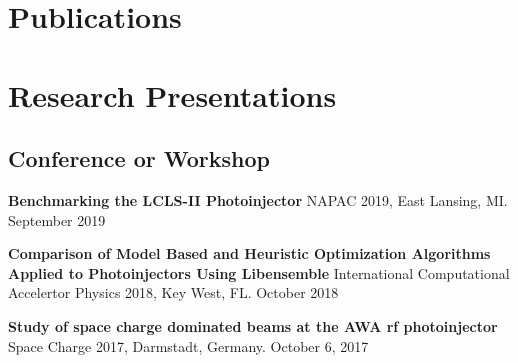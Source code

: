 \documentclass[11pt,a4paper,sans]{moderncv}        %
\begin{document}
\newpage

\section{Publications}

\vspace{1em}

\vspace{1em}

\vspace{1em}

\vspace{1em}

%

\section{Research Presentations}
\subsection{Conference or Workshop} %
\textbf{Benchmarking the LCLS-II Photoinjector}\newline
NAPAC 2019, East Lansing, MI. September 2019
\vspace{0.3em}

\textbf{Comparison of Model Based and Heuristic Optimization Algorithms \newline
	Applied to Photoinjectors Using Libensemble}\newline
International Computational Accelertor Physics 2018, Key West, FL. October 2018
\vspace{0.3em}

\textbf{Study of space charge dominated beams at the AWA rf photoinjector}\newline
Space Charge 2017, Darmstadt, Germany. October 6, 2017
\end{document}
